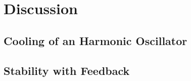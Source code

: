 \section{Discussion}

\subsection{Cooling of an Harmonic Oscillator}

\subsection{Stability with Feedback}